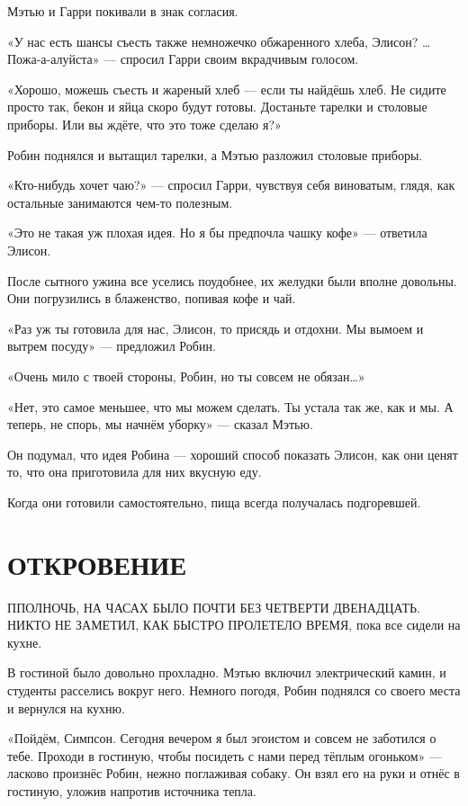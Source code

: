 \documentclass[a5paper, 9pt,
final, openany, twoside=true]{memoir}
\begin{document}
Мэтью и Гарри покивали в знак согласия.

«У нас есть шансы съесть также немножечко обжаренного хлеба, Элисон? … Пожа-а-алуйста» — спросил Гарри своим вкрадчивым голосом.

«Хорошо, можешь съесть и жареный хлеб — если ты найдёшь хлеб. Не сидите просто так, бекон и яйца скоро будут готовы. Достаньте тарелки и столовые приборы. Или вы ждёте, что это тоже сделаю я?»

Робин поднялся и вытащил тарелки, а Мэтью разложил столовые приборы.

«Кто-нибудь хочет чаю?» — спросил Гарри, чувствуя себя виноватым, глядя, как остальные занимаются чем-то полезным.

«Это не такая уж плохая идея. Но я бы предпочла чашку кофе» — ответила Элисон.

После сытного ужина все уселись поудобнее, их желудки были вполне довольны. Они погрузились в блаженство, попивая кофе и чай.

«Раз уж ты готовила для нас, Элисон, то присядь и отдохни. Мы вымоем и вытрем посуду» — предложил Робин.

«Очень мило с твоей стороны, Робин, но ты совсем не обязан…»

«Нет, это самое меньшее, что мы можем сделать. Ты устала так же, как и мы. А теперь, не спорь, мы начнём уборку» — сказал Мэтью.

Он подумал, что идея Робина — хороший способ показать Элисон, как они ценят то, что она приготовила для них вкусную еду.

Когда они готовили самостоятельно, пища всегда получалась подгоревшей.
\chapter{ОТКРОВЕНИЕ}
П{ ПОЛНОЧЬ, НА ЧАСАХ БЫЛО ПОЧТИ БЕЗ ЧЕТВЕРТИ ДВЕНАДЦАТЬ. НИКТО НЕ ЗАМЕТИЛ, КАК БЫСТРО ПРОЛЕТЕЛО ВРЕМЯ}, пока все сидели на кухне.\bigskip

В гостиной было довольно прохладно. Мэтью включил электрический камин, и студенты расселись вокруг него. Немного погодя, Робин поднялся со своего места и вернулся на кухню.

«Пойдём, Симпсон. Сегодня вечером я был эгоистом и совсем не заботился о тебе. Проходи в гостиную, чтобы посидеть с нами перед тёплым огоньком» — ласково произнёс Робин, нежно поглаживая собаку. Он взял его на руки и отнёс в гостиную, уложив напротив источника тепла.\bigskip
\end{document}
